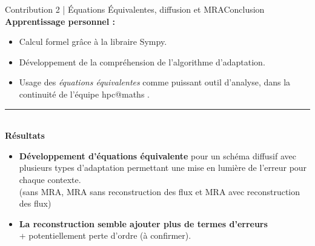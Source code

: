 \begin{frame}{Contribution 2 | Équations Équivalentes, diffusion et MRA}{Conclusion}
    \textbf{Apprentissage personnel : }\\
    \begin{itemize}
        \item Calcul formel grâce à la libraire Sympy.
        \item Développement de la compréhension de l'algorithme d'adaptation.
        \item Usage des \emph{équations équivalentes} comme puissant outil d'analyse, dans la continuité de l'équipe hpc@maths \cite{Massot2025_meshAdaptation,belloti_et_al_2025}.
    \end{itemize}
    \noindent\color{Primary}\rule{\linewidth}{0.6pt}\color{black}\\
    \textbf{Résultats}\\
        \begin{itemize}
            \item \textbf{Développement d'équations équivalente} pour un schéma diffusif avec plusieurs types d'adaptation
            permettant une mise en lumière de l'erreur pour chaque contexte.\\
            \scriptsize{(sans MRA, MRA sans reconstruction des flux et MRA avec reconstruction des flux)}
            \item \textbf{La reconstruction semble ajouter plus de termes d'erreurs}\\\scriptsize{+ potentiellement perte d'ordre (à confirmer).}
        \end{itemize}
\end{frame}